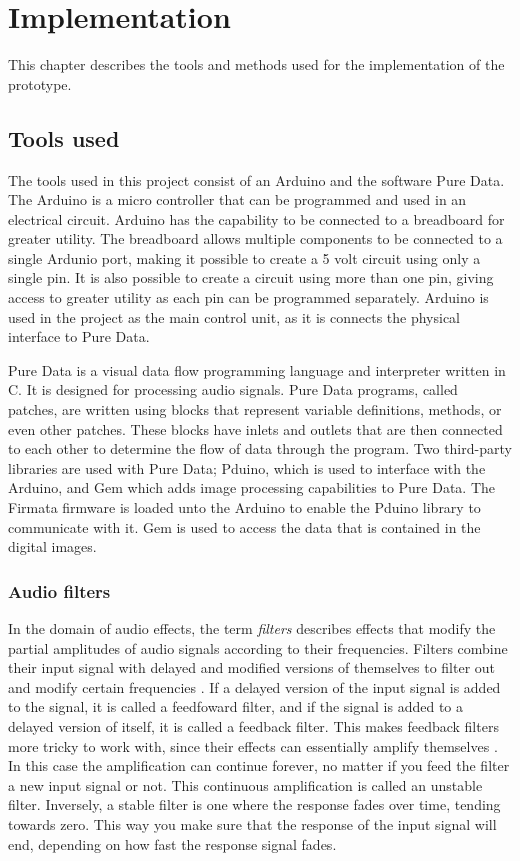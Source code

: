 \chapter{Implementation}\label{ch:implementation}
This chapter describes the tools and methods used for the implementation of the prototype. 

\section{Tools used}\label{sec:toolsused}
The tools used in this project consist of an Arduino and the software Pure Data. The Arduino is a micro controller that can be programmed and used in an electrical circuit. Arduino has the capability to be connected to a breadboard for greater utility. The breadboard allows multiple components to be connected to a single Ardunio port, making it possible to create a 5 volt circuit using only a single pin. It is also possible to create a circuit using more than one pin, giving access to greater utility as each pin can be programmed separately. Arduino is used in the project as the main control unit, as it is connects the physical interface to Pure Data. 

Pure Data is a visual data flow programming language and interpreter \cite{puredata} written in C. It is designed for processing audio signals. Pure Data programs, called patches, are written using blocks that represent variable definitions, methods, or even other patches. These blocks have inlets and outlets that are then connected to each other to determine the flow of data through the program. Two third-party libraries are used with Pure Data; Pduino, which is used to interface with the Arduino, and Gem which adds image processing capabilities to Pure Data. The Firmata firmware is loaded unto the Arduino to enable the Pduino library to communicate with it. Gem is used to access the data that is contained in the digital images.

\subsection{Audio filters}\label{sub:audiofilters}
In the domain of audio effects, the term \textit{filters} describes effects that modify the partial amplitudes of audio signals according to their frequencies. Filters combine their input signal with delayed and modified versions of themselves to filter out and modify certain frequencies \cite{zolzer2011dafx}. If a delayed version of the input signal is added to the signal, it is called a feedfoward filter, and if the signal is added to a delayed version of itself, it is called a feedback filter. This makes feedback filters more tricky to work with, since their effects can essentially amplify themselves \cite{steiglitz1997digital}. In this case the amplification can continue forever, no matter if you feed the filter a new input signal or not. This continuous amplification is called an unstable filter. Inversely, a stable filter is one where the response fades over time, tending towards zero. This way you make sure that the response of the input signal will end, depending on how fast the response signal fades.


